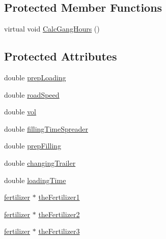 \subsection*{Protected Member Functions}
\begin{DoxyCompactItemize}
\item 
virtual void \hyperlink{classmineral_fert_tech_a60aff267f8d7906833524bbd0edcc39b}{CalcGangHours} ()
\end{DoxyCompactItemize}
\subsection*{Protected Attributes}
\begin{DoxyCompactItemize}
\item 
double \hyperlink{classmineral_fert_tech_a7c9bd299c03af4bdb13b3c8cbddd09e4}{prepLoading}
\item 
double \hyperlink{classmineral_fert_tech_a64d5f31461d62feb770da147e70d3c55}{roadSpeed}
\item 
double \hyperlink{classmineral_fert_tech_a5efd688c8112069834436a3a5b2f9915}{vol}
\item 
double \hyperlink{classmineral_fert_tech_adb73615336cace4cd67b3eaabb8f7512}{fillingTimeSpreader}
\item 
double \hyperlink{classmineral_fert_tech_adc35fbe91fe47afc7475b1912829bb57}{prepFilling}
\item 
double \hyperlink{classmineral_fert_tech_a5429bcb9cc9008ad8f0dfeac5da05439}{changingTrailer}
\item 
double \hyperlink{classmineral_fert_tech_acf32966a1aa9ce9f10469a48278c21b7}{loadingTime}
\item 
\hyperlink{classfertilizer}{fertilizer} $\ast$ \hyperlink{classmineral_fert_tech_a3d1eedcd67caf7308bfe7f9cdd3b18a1}{theFertilizer1}
\item 
\hyperlink{classfertilizer}{fertilizer} $\ast$ \hyperlink{classmineral_fert_tech_a18a5a6fa87be4cc1ca2ef3b6a1be1487}{theFertilizer2}
\item 
\hyperlink{classfertilizer}{fertilizer} $\ast$ \hyperlink{classmineral_fert_tech_a0aee75fa1b75ebd90d1d807ba5f5808c}{theFertilizer3}
\end{DoxyCompactItemize}


